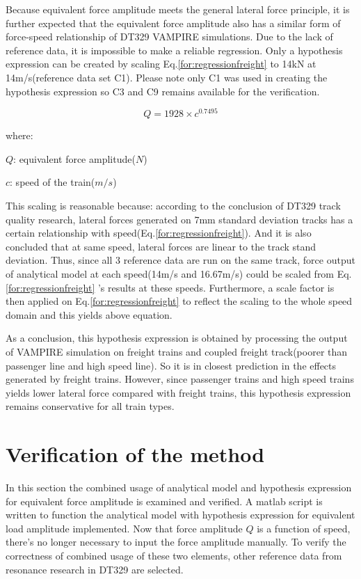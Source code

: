 Because equivalent force amplitude meets the general lateral force principle, it is further expected that the equivalent force amplitude also has a similar form of force-speed relationship of DT329 VAMPIRE simulations. Due to the lack of reference data, it is impossible to make a reliable regression. Only a hypothesis expression can be created by scaling Eq.\ref{for:regressionfreight} to 14kN at 14m/s(reference data set C1). Please note only C1 was used in creating the hypothesis expression so C3 and C9 remains available for the verification.

\begin{equation}
    Q= 1928\times c^{0.7495}
\end{equation}

where:

$Q$: equivalent force amplitude($N$)

$c$: speed of the train($m/s$)

This scaling is reasonable because: according to the conclusion of DT329 track quality research, lateral forces generated on 7mm standard deviation tracks has a certain relationship with speed(Eq.\ref{for:regressionfreight}). And it is also concluded that at same speed, lateral forces are linear to the track stand deviation. Thus, since all 3 reference data are run on the same track, force output of analytical model at each speed(14m/s and 16.67m/s) could be scaled from Eq.\ref{for:regressionfreight} 's results at these speeds. Furthermore, a scale factor is then applied on Eq.\ref{for:regressionfreight} to reflect the scaling to the whole speed domain and this yields above equation.

As a conclusion, this hypothesis expression is obtained by processing the output of VAMPIRE simulation on freight trains and coupled freight track(poorer than passenger line and high speed line). So it is in closest prediction in the effects generated by freight trains. However, since passenger trains and high speed trains yields lower lateral force compared with freight trains, this hypothesis expression remains conservative for all train types.

\section{Verification of the method}

In this section the combined usage of analytical model and hypothesis expression for equivalent force amplitude is examined and verified. A matlab script is written to function the analytical model with hypothesis expression for equivalent load amplitude implemented. Now that force amplitude $Q$ is a function of speed, there's no longer necessary to input the force amplitude manually. To verify the correctness of combined usage of these two elements, other reference data from resonance research in DT329 are selected. 

